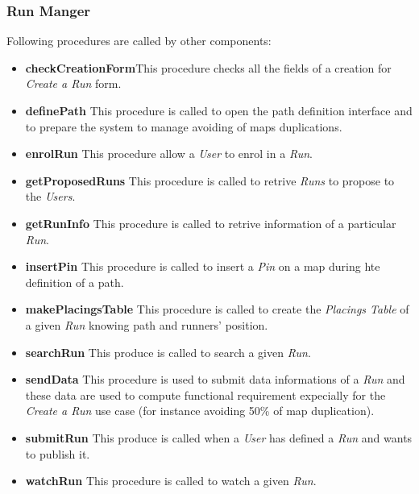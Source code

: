 \subsubsection{Run Manger}
\myparagraph{}
Following procedures are called by other components:
\begin{itemize}
  \item \textbf{checkCreationForm}\quad This procedure checks all the fields of a creation for \textit{Create a Run} form.

  \item \textbf{definePath} \quad This procedure is called to open the path definition interface and to prepare the system to manage avoiding of maps duplications.

  \item \textbf{enrolRun} \quad This procedure allow a \textit{User} to enrol in a \textit{Run}.

  \item \textbf{getProposedRuns} \quad This procedure is called to retrive \textit{Runs} to propose to the \textit{Users}.

  \item \textbf{getRunInfo} \quad This procedure is called to retrive information of a particular \textit{Run}.

  \item \textbf{insertPin} \quad This procedure is called to insert a \textit{Pin} on a map during hte definition of a path.

  \item \textbf{makePlacingsTable} \quad This procedure is called to create the \textit{Placings Table} of a given \textit{Run} knowing path and runners' position.

  \item \textbf{searchRun} \quad This produce is called to search a given \textit{Run}.

  \item \textbf{sendData} \quad This procedure is used to submit data informations of a \textit{Run} and these data are used to compute functional requirement expecially for the \textit{Create a Run} use case (for instance avoiding 50\% of map duplication).

  \item \textbf{submitRun} \quad This produce is called when a \textit{User} has defined a \textit{Run} and wants to publish it.

  \item \textbf{watchRun} \quad This procedure is called to watch a given \textit{Run}.
\end{itemize}

